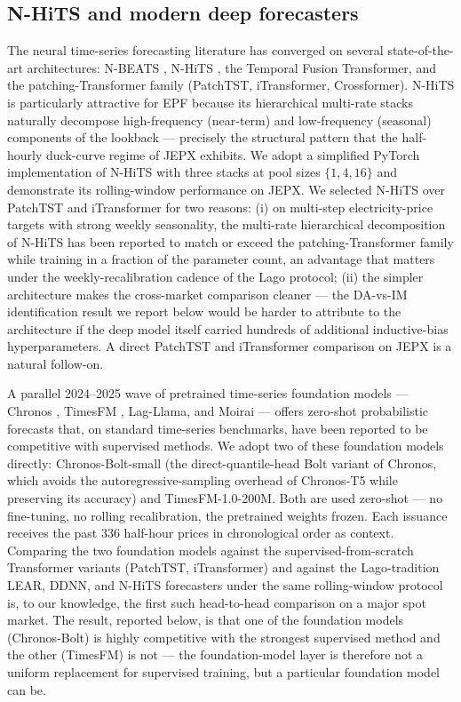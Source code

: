 \documentclass[review,3p,times,authoryear]{elsarticle}
\begin{document}
\subsection{N-HiTS and modern deep forecasters}
The neural time-series forecasting literature has converged on several state-of-the-art architectures: N-BEATS \citep{oreshkin2020}, N-HiTS \citep{nhits2023}, the Temporal Fusion Transformer, and the patching-Transformer family (PatchTST, iTransformer, Crossformer). N-HiTS is particularly attractive for EPF because its hierarchical multi-rate stacks naturally decompose high-frequency (near-term) and low-frequency (seasonal) components of the lookback --- precisely the structural pattern that the half-hourly duck-curve regime of JEPX exhibits. We adopt a simplified PyTorch implementation of N-HiTS with three stacks at pool sizes \(\{1, 4, 16\}\) and demonstrate its rolling-window performance on JEPX. We selected N-HiTS over PatchTST and iTransformer for two reasons: (i) on multi-step electricity-price targets with strong weekly seasonality, the multi-rate hierarchical decomposition of N-HiTS has been reported to match or exceed the patching-Transformer family while training in a fraction of the parameter count, an advantage that matters under the weekly-recalibration cadence of the Lago protocol; (ii) the simpler architecture makes the cross-market comparison cleaner --- the DA-vs-IM identification result we report below would be harder to attribute to the architecture if the deep model itself carried hundreds of additional inductive-bias hyperparameters. A direct PatchTST and iTransformer comparison on JEPX is a natural follow-on.

A parallel 2024--2025 wave of pretrained time-series foundation models --- Chronos \citep{ansari2024chronos}, TimesFM \citep{das2024timesfm}, Lag-Llama, and Moirai --- offers zero-shot probabilistic forecasts that, on standard time-series benchmarks, have been reported to be competitive with supervised methods. We adopt two of these foundation models directly: Chronos-Bolt-small (the direct-quantile-head Bolt variant of Chronos, which avoids the autoregressive-sampling overhead of Chronos-T5 while preserving its accuracy) and TimesFM-1.0-200M. Both are used zero-shot --- no fine-tuning, no rolling recalibration, the pretrained weights frozen. Each issuance receives the past 336 half-hour prices in chronological order as context. Comparing the two foundation models against the supervised-from-scratch Transformer variants (PatchTST, iTransformer) and against the Lago-tradition LEAR, DDNN, and N-HiTS forecasters under the same rolling-window protocol is, to our knowledge, the first such head-to-head comparison on a major spot market. The result, reported below, is that one of the foundation models (Chronos-Bolt) is highly competitive with the strongest supervised method and the other (TimesFM) is not --- the foundation-model layer is therefore not a uniform replacement for supervised training, but a particular foundation model can be.
\end{document}
